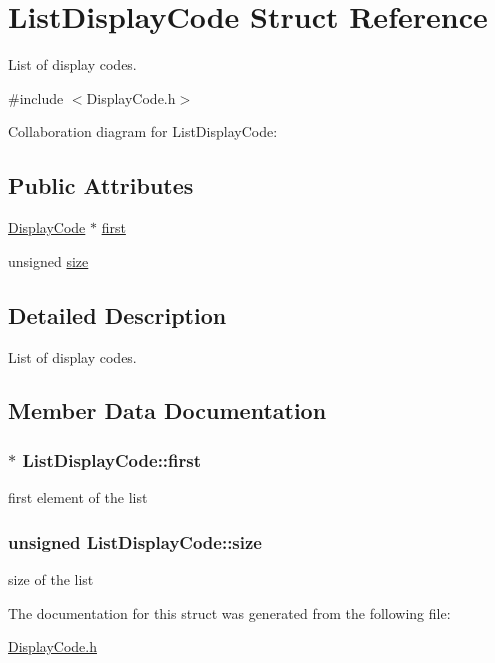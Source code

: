 \hypertarget{structListDisplayCode}{}\section{List\+Display\+Code Struct Reference}
\label{structListDisplayCode}


List of display codes.  




{\ttfamily \#include $<$Display\+Code.\+h$>$}



Collaboration diagram for List\+Display\+Code\+:
\subsection*{Public Attributes}
\begin{DoxyCompactItemize}
\item 
\hyperlink{structDisplayCode}{Display\+Code} $\ast$ \hyperlink{structListDisplayCode_a99e86ef649bd63f7229f45a1de400f3a}{first}
\item 
unsigned \hyperlink{structListDisplayCode_a996383aabad4d02cd3d9543143b6e72a}{size}
\end{DoxyCompactItemize}


\subsection{Detailed Description}
List of display codes. 

\subsection{Member Data Documentation}
\subsubsection[{\texorpdfstring{first}{first}}]{$\ast$ List\+Display\+Code\+::first}\hypertarget{structListDisplayCode_a99e86ef649bd63f7229f45a1de400f3a}{}\label{structListDisplayCode_a99e86ef649bd63f7229f45a1de400f3a}
first element of the list 
\subsubsection[{\texorpdfstring{size}{size}}]{\setlength{\rightskip}{0pt plus 5cm}unsigned List\+Display\+Code\+::size}\hypertarget{structListDisplayCode_a996383aabad4d02cd3d9543143b6e72a}{}\label{structListDisplayCode_a996383aabad4d02cd3d9543143b6e72a}
size of the list 

The documentation for this struct was generated from the following file\+:\begin{DoxyCompactItemize}
\item 
\hyperlink{DisplayCode_8h}{Display\+Code.\+h}\end{DoxyCompactItemize}
